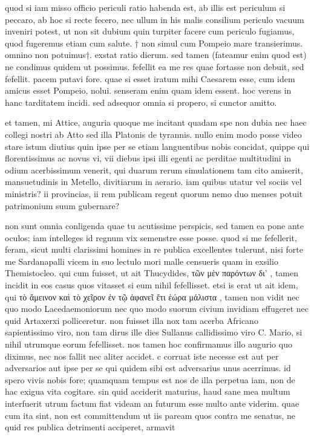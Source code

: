  quod si iam misso officio periculi ratio habenda est, ab illis est periculum si peccaro, ab hoc si recte fecero, nec ullum in his malis consilium periculo vacuum inveniri potest, ut non sit dubium quin turpiter facere cum periculo fugiamus, quod fugeremus etiam cum salute. † non simul cum Pompeio mare transierimus. omnino non potuimus†. exstat ratio dierum. sed tamen (fateamur enim quod est) ne condimus quidem ut possimus. fefellit ea me res quae fortasse non debuit, sed fefellit. pacem putavi fore. quae si esset iratum mihi Caesarem esse, cum idem amicus esset Pompeio, nolui. senseram enim quam idem essent. hoc verens in hanc tarditatem incidi. sed adsequor omnia si propero, si cunctor amitto.

 et tamen, mi Attice, auguria quoque me incitant quadam spe non dubia nec haec collegi nostri ab Atto sed illa Platonis de tyrannis. nullo enim modo posse video stare istum diutius quin ipse per se etiam languentibus nobis concidat, quippe qui florentissimus ac novus vi, vii diebus ipsi illi egenti ac perditae multitudini in odium acerbissimum venerit, qui duarum rerum simulationem tam cito amiserit, mansuetudinis in Metello, divitiarum in aerario. iam quibus utatur vel sociis vel ministris? ii provincias, ii rem publicam regent quorum nemo duo menses potuit patrimonium suum gubernare?

 non sunt omnia conligenda quae tu acutissime perspicis, sed tamen ea pone ante oculos; iam intelleges id regnum vix semenstre esse posse. quod si me fefellerit, feram, sicut multi clarissimi homines in re publica excellentes tulerunt, nisi forte me Sardanapalli vicem in suo lectulo mori malle censueris quam in exsilio Themistocleo. qui cum fuisset, ut ait Thucydides, τῶν μὲν παρόντων δι' , tamen incidit in eos casus quos vitasset si eum nihil fefellisset. etsi is erat ut ait idem, qui τὸ ἄμεινον καὶ τὸ χεῖρον ἐν τῷ ἀφανεῖ ἔτι ἑώρα μάλιστα , tamen non vidit nec quo modo Lacedaemoniorum nec quo modo suorum civium invidiam effugeret nec quid Artaxerxi polliceretur. non fuisset illa nox tam acerba Africano sapientissimo viro, non tam dirus ille dies Sullanus callidissimo viro C. Mario, si nihil utrumque eorum fefellisset. nos tamen hoc confirmamus illo augurio quo diximus, nec nos fallit nec aliter accidet. c corruat iste necesse est aut per adversarios aut ipse per se qui quidem sibi est adversarius unus acerrimus. id spero vivis nobis fore; quamquam tempus est nos de illa perpetua iam, non de hac exigua vita cogitare. sin quid acciderit maturius, haud sane mea multum interfuerit utrum factum fiat videam an futurum esse multo ante viderim. quae cum ita sint, non est committendum ut iis paream quos contra me senatus, ne quid res publica detrimenti acciperet, armavit

